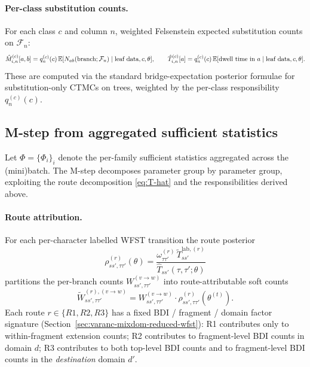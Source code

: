 \paragraph{Per-class substitution counts.}
For each class $c$ and column $n$, weighted Felsenstein expected
substitution counts on $\mathcal{F}_n$:
\begin{equation}
\label{eq:vbem-subst-counts}
\hat{M}^{(c)}_{i,n}[a, b] = q^{(c)}_n(c)\,
   \mathbb{E}[N_{ab}(\text{branch}; \mathcal{F}_n) \mid \text{leaf data},
                     c, \theta],
\qquad
\hat{T}^{(c)}_{i,n}[a] = q^{(c)}_n(c)\,
   \mathbb{E}[\text{dwell time in } a \mid \text{leaf data}, c, \theta].
\end{equation}
These are computed via the standard bridge-expectation posterior formulae
for substitution-only CTMCs on trees, weighted by the per-class
responsibility $q^{(c)}_n(c)$.

\subsection{M-step from aggregated sufficient statistics}
\label{sec:vbem-mstep}

Let $\Phi = \{\Phi_i\}_i$ denote the per-family sufficient statistics
aggregated across the (mini)batch. The M-step decomposes parameter
group by parameter group, exploiting the route decomposition
\eqref{eq:T-hat} and the responsibilities derived above.

\paragraph{Route attribution.}
For each per-character labelled WFST transition the route posterior
\begin{equation}
\label{eq:route-posterior}
\rho^{(r)}_{ss', \tau\tau'}(\theta) =
   \frac{\omega^{(r)}_{\tau\tau'}\, \tilde T^{\text{lab},(r)}_{ss'}}
        {\hat T_{ss'}(\tau, \tau'; \theta)}
\end{equation}
partitions the per-branch counts $W^{(v\to w)}_{ss', \tau\tau'}$
into route-attributable soft counts
\begin{equation}
\label{eq:route-soft-counts}
\tilde W^{(r), (v\to w)}_{ss', \tau\tau'} =
   W^{(v\to w)}_{ss', \tau\tau'} \cdot \rho^{(r)}_{ss', \tau\tau'}(\theta^{(t)}).
\end{equation}
Each route $r \in \{R1, R2, R3\}$ has a fixed BDI / fragment / domain
factor signature
(Section~\ref{sec:varanc-mixdom-reduced-wfst}):
R1 contributes only to within-fragment extension counts; R2 contributes
to fragment-level BDI counts in domain $d$; R3 contributes to both
top-level BDI counts and to fragment-level BDI counts in the
\emph{destination} domain $d'$.

